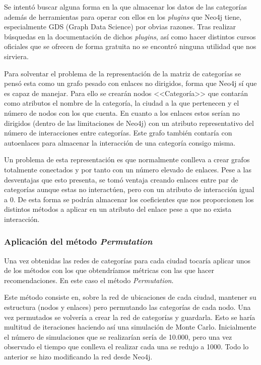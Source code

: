 Se intentó buscar alguna forma en la que almacenar los datos de las categorías además de herramientas para operar con ellos en los \textit{plugins} que Neo4j tiene, especialmente GDS (Graph Data Science) por obvias razones. Tras realizar búsquedas en la documentación de dichos \textit{plugins}, así como hacer distintos cursos oficiales que se ofrecen de forma gratuita no se encontró ninguna utilidad que nos sirviera.

Para solventar el problema de la representación de la matriz de categorías se pensó esta como un grafo pesado con enlaces no dirigidos, forma que Neo4j sí que es capaz de manejar. Para ello se crearán nodos <<Categoría>> que contarán como atributos el nombre de la categoría, la ciudad a la que pertenecen y el número de nodos con los que cuenta. En cuanto a los enlaces estos serían no dirigidos (dentro de las limitaciones de Neo4j) con un atributo representativo del número de interacciones entre categorías. Este grafo también contaría con autoenlaces para almacenar la interacción de una categoría consigo misma. 


Un problema de esta representación es que normalmente conlleva a crear grafos totalmente conectados y por tanto con un número elevado de enlaces. Pese a las desventajas que esto presenta, se tomó ventaja creando enlaces entre par de categorías aunque estas no interactúen, pero con un atributo de interacción igual a 0. De esta forma se podrán almacenar los coeficientes que nos proporcionen los distintos métodos a aplicar en un atributo del enlace pese a que no exista interacción.

\subsubsection{Aplicación del método \textit{Permutation}}
Una vez obtenidas las redes de categorías para cada ciudad tocaría aplicar unos de los métodos con los que obtendríamos métricas con las que hacer recomendaciones. En este caso el método \textit{Permutation}.

Este método consiste en, sobre la red de ubicaciones de cada ciudad, mantener su estructura (nodos y enlaces) pero permutando las categorías de cada nodo. Una vez permutados se volvería a crear la red de categorías y guardarla. Esto se haría multitud de iteraciones haciendo así una simulación de Monte Carlo. Inicialmente el número de simulaciones que se realizarían sería de 10.000, pero una vez observado el tiempo que conlleva el realizar cada una se redujo a 1000. Todo lo anterior se hizo modificando la red desde Neo4j.

